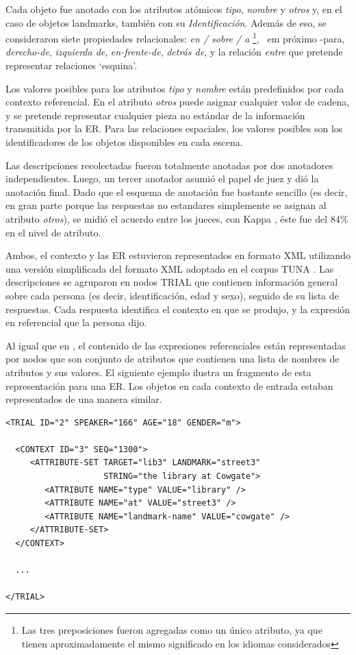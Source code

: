 Cada objeto fue anotado con los atributos at\'omicos {\em tipo}, {\em nombre} y {\em otros} y, en el caso de objetos landmarks, tambi\'en con su {\em Identificaci\'on}. Adem\'as de eso, se consideraron siete propiedades relacionales: {\em en / sobre / a} \footnote{Las tres preposiciones fueron agregadas como un \'unico atributo, ya que tienen aproximadamente el mismo significado en los idiomas considerados}, {\ em pr\'oximo -para}, {\em derecho-de}, {\em izquierda de}, {\em en-frente-de}, {\em detr\'as de}, y la relaci\'on {\em entre} que pretende representar relaciones `esquina'.


Los valores posibles para los atributos {\em tipo} y {\em nombre} est\'an predefinidos por cada contexto referencial. En el atributo {\em otros} puede asignar cualquier valor de cadena, y se pretende representar cualquier pieza no est\'andar de la informaci\'on transmitida por la ER. Para las relaciones espaciales, los valores posibles son los identificadores de los objetos disponibles en cada escena.

Las descripciones recolectadas fueron totalmente anotadas por dos anotadores independientes. Luego, un tercer anotador asumi\'o el papel de juez y di\'o la anotaci\'on final. Dado que el esquema de anotaci\'on fue bastante sencillo (es decir, en gran parte porque las respuestas no estandares simplemente se asignan al atributo {\em otros}), se midi\'o el acuerdo entre los jueces, con Kappa \cite{kappa}, \'este fue del 84\% en el nivel de atributo.

Ambos, el contexto y las ER estuvieron representados en formato XML utilizando una versi\'on simplificada del formato XML adoptado en el corpus TUNA \cite{tuna-corpus}. Las descripciones se agruparon en nodos TRIAL que contienen informaci\'on general sobre cada persona (es decir, identificaci\'on, edad y sexo), seguido de su lista de respuestas. Cada respuesta identifica el contexto en que se produjo, y la expresi\'on en referencial que la persona dijo.

Al igual que en \cite{tuna-corpus}, el contenido de las expresiones referenciales est\'an representadas por nodos que son conjunto de atributos que contienen una lista de nombres de atributos y sus valores. El siguiente ejemplo ilustra un fragmento de esta representaci\'on para una ER. Los objetos en cada contexto de entrada estaban representados de una manera similar.


\tiny{
\begin{verbatim}
<TRIAL ID="2" SPEAKER="166" AGE="18" GENDER="m">

  <CONTEXT ID="3" SEQ="1300">
     <ATTRIBUTE-SET TARGET="lib3" LANDMARK="street3" 
                    STRING="the library at Cowgate">
        <ATTRIBUTE NAME="type" VALUE="library" />
        <ATTRIBUTE NAME="at" VALUE="street3" />
        <ATTRIBUTE NAME="landmark-name" VALUE="cowgate" />
     </ATTRIBUTE-SET>
  </CONTEXT>

  ...
	
</TRIAL>	
\end{verbatim}
}
\normalsize


